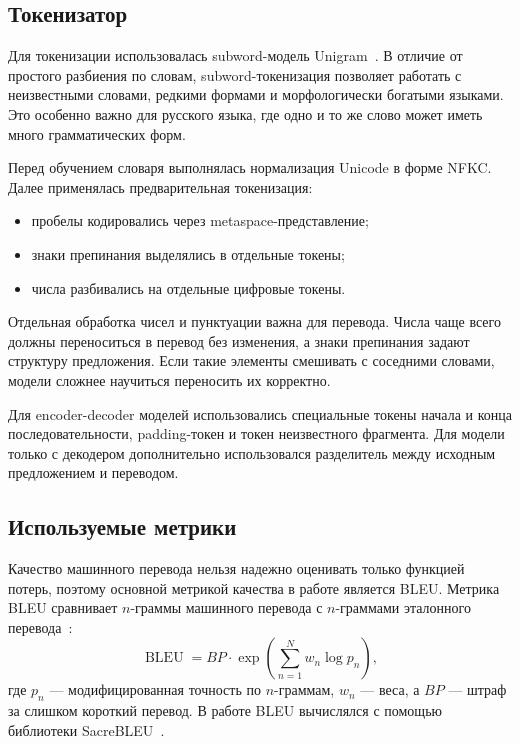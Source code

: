\subsection{Токенизатор}

Для токенизации использовалась subword-модель Unigram~\cite{sentencepiece}.
В отличие от простого разбиения по словам, subword-токенизация позволяет работать с неизвестными словами, редкими формами и морфологически богатыми языками.
Это особенно важно для русского языка, где одно и то же слово может иметь много грамматических форм.

Перед обучением словаря выполнялась нормализация Unicode в форме NFKC.
Далее применялась предварительная токенизация:
\begin{itemize}
    \item пробелы кодировались через metaspace-представление;
    \item знаки препинания выделялись в отдельные токены;
    \item числа разбивались на отдельные цифровые токены.
\end{itemize}

Отдельная обработка чисел и пунктуации важна для перевода.
Числа чаще всего должны переноситься в перевод без изменения, а знаки препинания задают структуру предложения.
Если такие элементы смешивать с соседними словами, модели сложнее научиться переносить их корректно.

Для encoder-decoder моделей использовались специальные токены начала и конца последовательности, padding-токен и токен неизвестного фрагмента.
Для модели только с декодером дополнительно использовался разделитель между исходным предложением и переводом.

\subsection{Используемые метрики}

Качество машинного перевода нельзя надежно оценивать только функцией потерь, поэтому основной метрикой качества в работе является BLEU.
Метрика BLEU сравнивает $n$-граммы машинного перевода с $n$-граммами эталонного перевода~\cite{bleu}:
\begin{equation}
    \operatorname{BLEU} = BP \cdot \exp\left(\sum_{n=1}^{N} w_n \log p_n\right),
\end{equation}
где $p_n$ --- модифицированная точность по $n$-граммам, $w_n$ --- веса, а $BP$ --- штраф за слишком короткий перевод.
В работе BLEU вычислялся с помощью библиотеки SacreBLEU~\cite{sacrebleu}.

